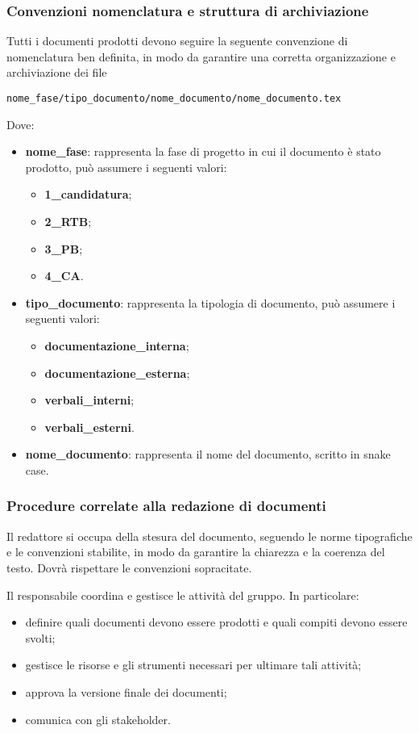 \subsubsection{Convenzioni nomenclatura e struttura di archiviazione}
Tutti i documenti prodotti devono seguire la seguente convenzione di nomenclatura ben definita, in modo da garantire una corretta organizzazione e archiviazione dei file
\begin{center}
	\texttt{nome\_fase/tipo\_documento/nome\_documento/nome\_documento.tex}
\end{center}
Dove:
\begin{itemize}
	\item \textbf{nome\_fase}: rappresenta la fase di progetto in cui il documento è stato prodotto, può assumere i seguenti valori:
	      \begin{itemize}
		      \item \textbf{1\_candidatura};
		      \item \textbf{2\_RTB};
		      \item \textbf{3\_PB};
		      \item \textbf{4\_CA}.
	      \end{itemize}
	\item \textbf{tipo\_documento}: rappresenta la tipologia di documento, può assumere i seguenti valori:
	      \begin{itemize}
		      \item \textbf{documentazione\_interna};
		      \item \textbf{documentazione\_esterna};
		      \item \textbf{verbali\_interni};
		      \item \textbf{verbali\_esterni}.
	      \end{itemize}
	\item \textbf{nome\_documento}: rappresenta il nome del documento, scritto in snake case.
\end{itemize}

\subsubsection{Procedure correlate alla redazione di documenti}
Il redattore si occupa della stesura del documento, seguendo le norme tipografiche e le convenzioni stabilite, in modo da garantire la
chiarezza e la coerenza del testo. Dovrà rispettare le convenzioni sopracitate.

Il responsabile coordina e gestisce le attività del gruppo. In particolare:
\begin{itemize}
	\item definire quali documenti devono essere prodotti e quali compiti devono essere svolti;
	\item gestisce le risorse e gli strumenti necessari per ultimare tali attività;
	\item approva la versione finale dei documenti;
	\item comunica con gli stakeholder.
\end{itemize}

